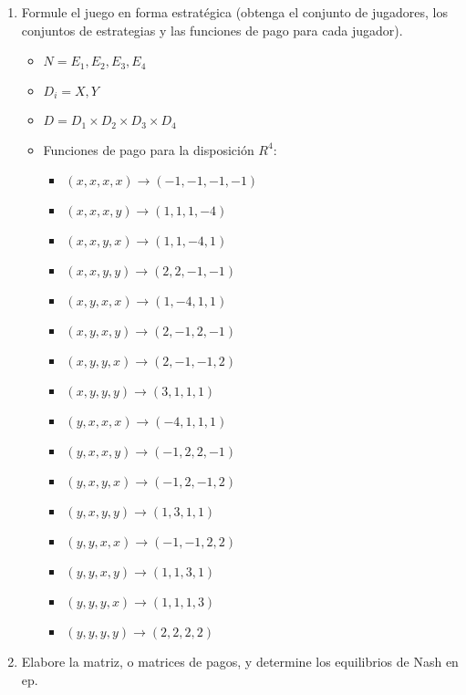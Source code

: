 \documentclass{homework}
\begin{document}
\begin{enumerate}
    \item Formule el juego en forma estratégica (obtenga el conjunto de jugadores, los conjuntos de estrategias y las funciones de pago para cada jugador).
        \begin{itemize}
            \item $N={E_1, E_2, E_3, E_4}$
            \item $D_i={X, Y}$
            \item $D=D_1 \times D_2 \times D_3 \times D_4$
            \item Funciones de pago para la disposición $R^4$:\\
            \begin{itemize}
                \item $(x,x,x,x) \rightarrow (-1,-1,-1,-1)$ 
                \item $(x,x,x,y) \rightarrow (1,1,1,-4)$
                \item $(x,x,y,x) \rightarrow (1,1,-4,1)$
                \item $(x,x,y,y) \rightarrow (2,2,-1,-1)$
                \item $(x,y,x,x) \rightarrow (1,-4,1,1)$
                \item $(x,y,x,y) \rightarrow (2,-1,2,-1)$
                \item $(x,y,y,x) \rightarrow (2,-1,-1,2)$
                \item $(x,y,y,y) \rightarrow (3,1,1,1)$
                \item $(y,x,x,x) \rightarrow (-4,1,1,1)$
                \item $(y,x,x,y) \rightarrow (-1,2,2,-1)$
                \item $(y,x,y,x) \rightarrow (-1,2,-1,2)$
                \item $(y,x,y,y) \rightarrow (1,3,1,1)$
                \item $(y,y,x,x) \rightarrow (-1,-1,2,2)$
                \item $(y,y,x,y) \rightarrow (1,1,3,1)$
                \item $(y,y,y,x) \rightarrow (1,1,1,3)$
                \item $(y,y,y,y) \rightarrow (2,2,2,2)$
            \end{itemize}
            
        \end{itemize}
    \item Elabore la matriz, o matrices de pagos, y determine los equilibrios de Nash en ep.

\end{enumerate}
\end{document}
